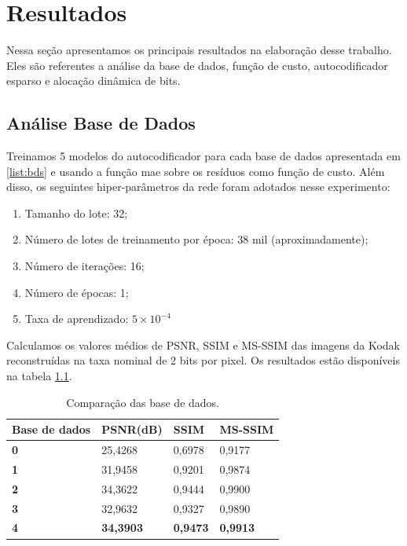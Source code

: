 
\chapter{Resultados}
Nessa seção apresentamos os principais resultados na elaboração desse trabalho. Eles são referentes a análise da base de dados, função de custo, autocodificador esparso e alocação dinâmica de bits. 


\section{Análise Base de Dados}

Treinamos 5 modelos do autocodificador para cada base de dados apresentada em \ref{list:bds} e usando a função \acrshort{mae} sobre os resíduos como função de custo. Além disso, os seguintes hiper-parâmetros da rede foram adotados nesse experimento: 

\begin{enumerate}
	\label{enum:hiper_param}
	\item Tamanho do lote: 32; 
	\item Número de lotes de treinamento por época: 38 mil (aproximadamente);   
	\item Número de iterações: 16;
	\item Número de épocas: 1;
	\item Taxa de aprendizado: $5 \times {10}^{-4}$
\end{enumerate}

Calculamos os valores médios de PSNR, SSIM e MS-SSIM das imagens da Kodak reconstruídas na taxa nominal de 2 bits por pixel. Os resultados estão disponíveis na tabela \ref{table:comp_datasets}.


\begin{table}[htbp]
	\centering
	\caption{Comparação das base de dados.}
	\begin{tabular}{|l|l|l|l|}
		\hline
		\textbf{Base de dados} & \textbf{PSNR(dB)}    & \textbf{SSIM}   & \textbf{MS-SSIM}\\\hline
		\textbf{0}            & 25,4268          & 0,6978          & 0,9177           \\\hline
		\textbf{1}            & 31,9458          & 0,9201          & 0,9874           \\\hline
		\textbf{2}            & 34,3622          & 0,9444          & 0,9900           \\\hline
		\textbf{3}            & 32,9632	       & 0,9327          & 0,9890           \\\hline
		\textbf{4}            & \textbf{34,3903} & \textbf{0,9473} & \textbf{0,9913}     
		\\ \hline
	\end{tabular}
	\label{table:comp_datasets}
\end{table}

